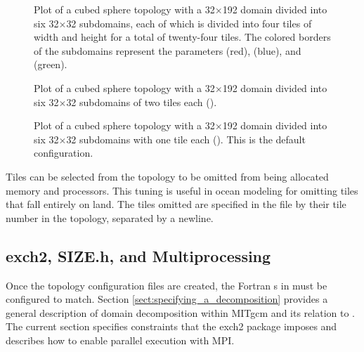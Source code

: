 \begin{figure}
\begin{center}
\end{center} 

\caption{Plot of a cubed sphere topology with a 32$\times$192 domain
divided into six 32$\times$32 subdomains, each of which is divided
into four tiles of width  and height  for a 
total of twenty-four tiles.  The colored borders of the subdomains 
represent the parameters  (red),  (blue), and 
 (green).  } \label{fig:24tile}
\end{figure}

\begin{figure}
\begin{center}
\end{center} 
\caption{Plot of a cubed sphere topology with a 32$\times$192 domain
divided into six 32$\times$32 subdomains of two tiles each
 ().
} \label{fig:12tile}
\end{figure}

\begin{figure}
\begin{center}
\end{center} 
\caption{Plot of a cubed sphere topology with a 32$\times$192 domain
divided into six 32$\times$32 subdomains with one tile each
().  This is the default configuration.
  }
\label{fig:6tile}
\end{figure}


Tiles can be selected from the topology to be omitted from being
allocated memory and processors.  This tuning is useful in ocean
modeling for omitting tiles that fall entirely on land.  The tiles
omitted are specified in the file
by their tile number in the topology, separated by a newline. \\




\subsection{exch2, SIZE.h, and Multiprocessing}
\label{sec:exch2mpi}

Once the topology configuration files are created, the Fortran
s in  must be configured to match.
Section \ref{sect:specifying_a_decomposition}  provides a general description of domain
decomposition within MITgcm and its relation to . The
current section specifies constraints that the exch2 package
imposes and describes how to enable parallel execution with
MPI. \\

